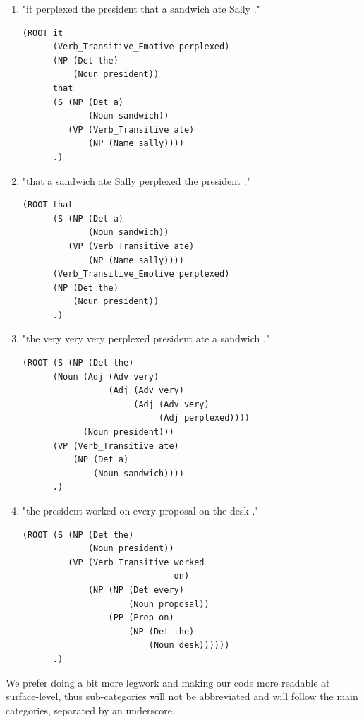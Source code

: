 \documentclass[11pt]{article}
\begin{document}
\begin{enumerate}[label=(\arabic*)]
      \item "it perplexed the president that a sandwich ate Sally ."

            \begin{verbatim}
(ROOT it
      (Verb_Transitive_Emotive perplexed)
      (NP (Det the)
          (Noun president))
      that
      (S (NP (Det a)
             (Noun sandwich))
         (VP (Verb_Transitive ate)
             (NP (Name sally))))
      .)
\end{verbatim}

      \item "that a sandwich ate Sally perplexed the president ."

            \begin{verbatim}
(ROOT that
      (S (NP (Det a)
             (Noun sandwich))
         (VP (Verb_Transitive ate)
             (NP (Name sally))))
      (Verb_Transitive_Emotive perplexed)
      (NP (Det the)
          (Noun president))
      .)
\end{verbatim}

      \item "the very very very perplexed president ate a sandwich ."

            \begin{verbatim}
(ROOT (S (NP (Det the)
      (Noun (Adj (Adv very)
                 (Adj (Adv very)
                      (Adj (Adv very)
                           (Adj perplexed))))
            (Noun president)))
      (VP (Verb_Transitive ate)
          (NP (Det a)
              (Noun sandwich))))
      .)
\end{verbatim}

      \item "the president worked on every proposal on the desk ."

            \begin{verbatim}
(ROOT (S (NP (Det the)
             (Noun president))
         (VP (Verb_Transitive worked
                              on)
             (NP (NP (Det every)
                     (Noun proposal))
                 (PP (Prep on)
                     (NP (Det the)
                         (Noun desk))))))
      .)
            \end{verbatim}
\end{enumerate}

\noindent We prefer doing a bit more legwork and making our code more readable at surface-level, thus sub-categories will not be abbreviated and will follow the main categories, separated by an underscore.
\end{document}

